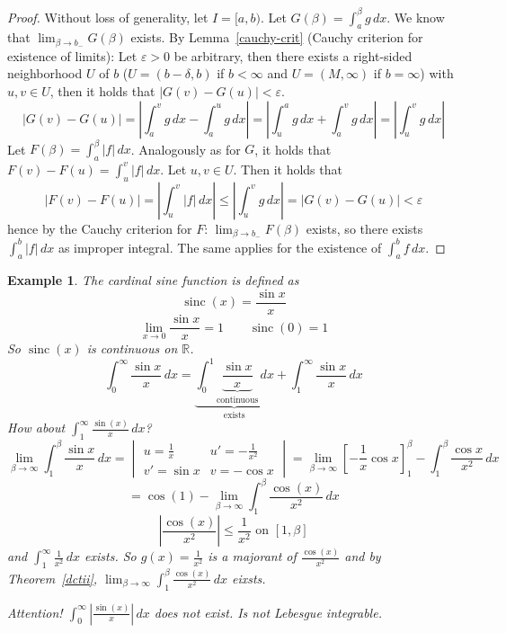 \documentclass{article}
\newtheorem{example}{Example}  \numberwithin{example}{section}
\newcommand{\card}[1]{\left|#1\right|}
\DeclareMathOperator{\sinc}{sinc}
\begin{document}
\begin{proof}
  Without loss of generality, let $I = [a,b)$.
  Let $G(\beta) = \int_a^\beta g \, dx$. We know that $\lim_{\beta \to b_-} G(\beta)$ exists.
  By Lemma~\ref{cauchy-crit} (Cauchy criterion for existence of limits):
  Let $\varepsilon > 0$ be arbitrary, then there exists a right-sided neighborhood $U$ of $b$
  ($U = (b - \delta, b)$ if $b < \infty$ and $U = (M, \infty)$ if $b = \infty$)
  with $u,v \in U$, then it holds that $\card{G(v) - G(u)} < \varepsilon$.
  \[
    \card{G(v) - G(u)} = \card{\int_a^v g \, dx - \int_a^u g \, dx}
      = \card{\int_u^a g \, dx + \int_a^v g \, dx}
      = \card{\int_u^v g \, dx}
  \]
  Let $F(\beta) = \int_a^\beta \card{f} \, dx$.
  Analogously as for $G$, it holds that $F(v) - F(u) = \int_u^v \card{f} \, dx$.
  Let $u,v \in U$. Then it holds that
  \[
    \card{F(v) - F(u)} = \card{\int_u^v \card{f} \, dx} \leq \card{\int_u^v g \, dx}
      = \card{G(v) - G(u)} < \varepsilon
  \]
  hence by the Cauchy criterion for $F$:
  $\lim_{\beta\to b_-} F(\beta)$ exists, so there exists $\int_a^b \card{f} \, dx$ as improper integral.
  The same applies for the existence of $\int_a^b f \, dx$.
\end{proof}

\begin{example}
  The cardinal sine function is defined as
  \[ \sinc(x) = \frac{\sin{x}}{x} \]
  \[ \lim_{x\to 0} \frac{\sin{x}}{x} = 1 \qquad \sinc(0) = 1 \]
  So $\sinc(x)$ is continuous on $\mathbb R$.
  \[ \int_0^\infty \frac{\sin{x}}{x} \, dx = \underbrace{\int_0^1 \underbrace{\frac{\sin{x}}{x}}_{\text{continuous}} \, dx}_{\text{exists}} + \int_1^\infty \frac{\sin{x}}{x} \, dx \]
  How about $\int_1^\infty \frac{\sin(x)}{x} \, dx$?
  \[
    \lim_{\beta\to\infty} \int_1^\beta \frac{\sin{x}}{x} \, dx =
      \begin{vmatrix}
        u = \frac1x & u' = -\frac1{x^2} \\
        v' = \sin{x} & v = -\cos{x}
      \end{vmatrix}
      = \lim_{\beta\to\infty} \left[
        -\frac1x \cos{x}
      \right]_1^\beta - \int_1^\beta \frac{\cos{x}}{x^2} \, dx
  \] \[
    = \cos(1) - \lim_{\beta\to\infty} \int_1^\beta \frac{\cos(x)}{x^2} \, dx
  \] \[
    \card{\frac{\cos(x)}{x^2}} \leq \frac1{x^2} \text{ on } [1, \beta]
  \]
  and $\int_1^\infty \frac1{x^2} \, dx$ exists.
  So $g(x) = \frac1{x^2}$ is a majorant of $\frac{\cos(x)}{x^2}$ and by Theorem~\ref{dctii},
  $\lim_{\beta\to\infty} \int_1^\beta \frac{\cos(x)}{x^2} \, dx$ eixsts.

  Attention! $\int_0^\infty \card{\frac{\sin(x)}{x}} \, dx$ does not exist. Is not Lebesgue integrable.
\end{example}
\end{document}
